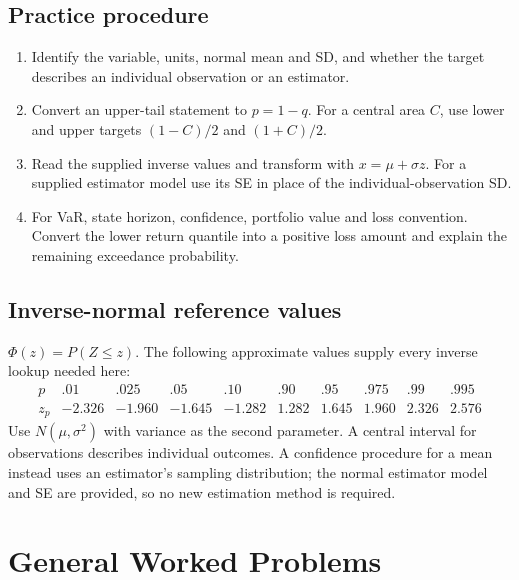 \subsection{Practice procedure}
\begin{enumerate}
\item Identify the variable, units, normal mean and SD, and whether the target describes an individual observation or an estimator.
\item Convert an upper-tail statement to $p=1-q$. For a central area $C$, use lower and upper targets $(1-C)/2$ and $(1+C)/2$.
\item Read the supplied inverse values and transform with $x=\mu+\sigma z$. For a supplied estimator model use its SE in place of the individual-observation SD.
\item For VaR, state horizon, confidence, portfolio value and loss convention. Convert the lower return quantile into a positive loss amount and explain the remaining exceedance probability.
\end{enumerate}
\subsection{Inverse-normal reference values}
$\Phi(z)=P(Z\le z)$. The following approximate values supply every inverse lookup needed here:
\[
\begin{array}{c|rrrrrrrrr}
p&.01&.025&.05&.10&.90&.95&.975&.99&.995\\ \hline
z_p&-2.326&-1.960&-1.645&-1.282&1.282&1.645&1.960&2.326&2.576
\end{array}
\]
Use $N(\mu,\sigma^2)$ with variance as the second parameter. A central interval for observations describes individual outcomes. A confidence procedure for a mean instead uses an estimator's sampling distribution; the normal estimator model and SE are provided, so no new estimation method is required.
\section{General Worked Problems}\label{sec:general-worked}


